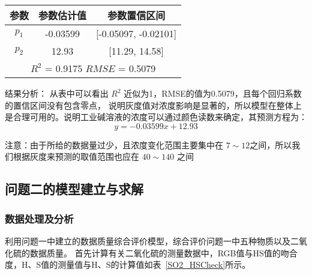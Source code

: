     \begin{table}[H]
        \centering
        \begin{tabular}{|c|c|c|}
            \hline
            参数     & 参数估计值  & 参数置信区间        \\ 
            \hline
            $p_1$  & -0.03599 & [-0.05097, -0.02101] \\
            \hline
            $p_2$  & 12.93  & [11.29, 14.58]   \\
            \hline
            \multicolumn{3}{|c|}{$R^2$ = 0.9175 $RMSE$ = 0.5079}  \\                                            
            \hline
        \end{tabular}
        \end{table}

    结果分析： 从表中可以看出 $R^2$ 近似为1，RMSE的值为0.5079，且每个回归系数的置信区间没有包含零点，
    说明灰度值对浓度影响是显著的，所以模型在整体上是合理可用的。说明工业碱溶液的浓度可以通过颜色读数来确定，其预测方程为：
        $$y = -0.03599 x + 12.93 $$

    注意：由于所给的数据量过少，且浓度变化范围主要集中在 $7 \sim 12$之间，所以我们根据灰度来预测的取值范围也应在 $40 \sim 140$
    之间



\subsection{问题二的模型建立与求解}

\subsubsection{数据处理及分析}

利用问题一中建立的数据质量综合评价模型，综合评价问题一中五种物质以及二氧化硫的数据质量。
首先计算有关二氧化硫的测量数据中，RGB值与HS值的吻合度，H、S值的测量值与H、S的计算值如表~\ref{SO2_HSCheck}所示。

